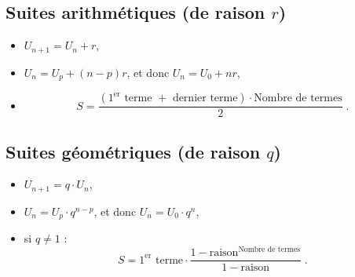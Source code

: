 \TCDLessonStyleOff
\begin{fiche}
      \subsection*{Suites arithm\'etiques (de raison $r$)}
            \begin{itemize}
                  \item $U_{n+1} = U_n + r$,
                  \item $U_n = U_p + (n-p) r$, et donc $U_n = U_0 + n r$,
                  \item \[
                              S = \frac{
                                          \left(
                                                \text{$1^\text{er}$ terme $+$ dernier terme}
                                          \right)
                                          \cdot
                                          \text{Nombre de termes}
                                       }{2}      \;.
                        \]
            \end{itemize}
      \subsection*{Suites g\'eom\'etriques (de raison $q$)}
            \begin{itemize}
                  \item $U_{n+1} = q \cdot U_n $,
                  \item $U_n = U_p \cdot q^{n-p}$, et donc $U_n = U_0 \cdot q^n$,
                  \item si $q \neq 1$ : \[
                              S = \text{$1^{\text{er}}$ terme}
                                    \cdot
                                  \frac{
                                             1-\text{raison}^{\text{Nombre de termes}}
                                       }{
                                             1-\text{raison}
                                       }      \;.
                        \]
            \end{itemize}

\end{fiche}
